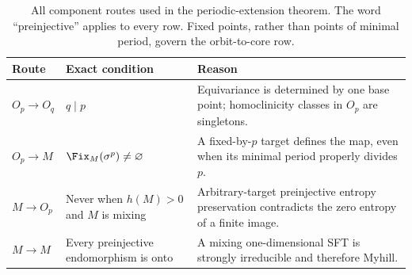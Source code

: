 \begin{table}[t]
\centering
\caption{All component routes used in the periodic-extension theorem.  The
word ``preinjective'' applies to every row.  Fixed points, rather than points
of minimal period, govern the orbit-to-core row.}
\label{tab:routes}
\small
\begin{tabularx}{\textwidth}{@{}>{\raggedright\arraybackslash}p{24mm}
  >{\raggedright\arraybackslash}p{42mm}X@{}}
\toprule
Route & Exact condition & Reason \\
\midrule
$O_p\to O_q$ & $q\mid p$ & Equivariance is determined by one base point;
homoclinicity classes in $O_p$ are singletons. \\
$O_p\to M$ & $\Fix_M(\sigma^p)\ne\varnothing$ & A fixed-by-$p$ target
defines the map, even when its minimal period properly divides $p$. \\
$M\to O_p$ & Never when $h(M)>0$ and $M$ is mixing & Arbitrary-target
preinjective entropy preservation contradicts the zero entropy of a finite
image. \\
$M\to M$ & Every preinjective endomorphism is onto & A mixing
one-dimensional SFT is strongly irreducible and therefore Myhill. \\
\bottomrule
\end{tabularx}
\end{table}

